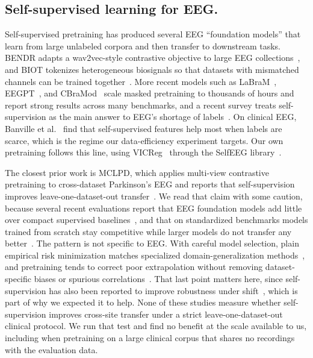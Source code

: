 \documentclass[runningheads]{llncs}
\begin{document}
\subsection{Self-supervised learning for EEG.}
Self-supervised pretraining has produced several EEG ``foundation models'' that learn from large unlabeled corpora and then transfer to downstream tasks. BENDR adapts a wav2vec-style contrastive objective to large EEG collections~\cite{bendr2021}, and BIOT tokenizes heterogeneous biosignals so that datasets with mismatched channels can be trained together~\cite{biot2023}. More recent models such as LaBraM~\cite{labram2024}, EEGPT~\cite{eegpt2024}, and CBraMod~\cite{cbramod2025} scale masked pretraining to thousands of hours and report strong results across many benchmarks, and a recent survey treats self-supervision as the main answer to EEG's shortage of labels~\cite{weng2024sslsurvey}. On clinical EEG, Banville et al.~\cite{banville2021} find that self-supervised features help most when labels are scarce, which is the regime our data-efficiency experiment targets. Our own pretraining follows this line, using VICReg~\cite{vicreg2022} through the SelfEEG library~\cite{selfeeg2024}.

The closest prior work is MCLPD, which applies multi-view contrastive pretraining to cross-dataset Parkinson's EEG and reports that self-supervision improves leave-one-dataset-out transfer~\cite{mclpd2025}. We read that claim with some caution, because several recent evaluations report that EEG foundation models add little over compact supervised baselines~\cite{lee2025lbm}, and that on standardized benchmarks models trained from scratch stay competitive while larger models do not transfer any better~\cite{liu2026eegfm}. The pattern is not specific to EEG. With careful model selection, plain empirical risk minimization matches specialized domain-generalization methods~\cite{gulrajani2021}, and pretraining tends to correct poor extrapolation without removing dataset-specific biases or spurious correlations~\cite{cohenwang2024}. That last point matters here, since self-supervision has also been reported to improve robustness under shift~\cite{hendrycks2019ssl}, which is part of why we expected it to help. None of these studies measure whether self-supervision improves cross-site transfer under a strict leave-one-dataset-out clinical protocol. We run that test and find no benefit at the scale available to us, including when pretraining on a large clinical corpus that shares no recordings with the evaluation data.
\end{document}
